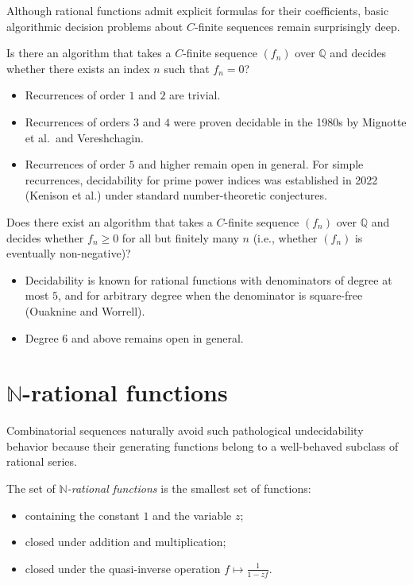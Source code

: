 Although rational functions admit explicit formulas for their coefficients, basic algorithmic decision problems about \(C\)-finite sequences remain surprisingly deep.

\begin{remark}
    Is there an algorithm that takes a \(C\)-finite sequence \((f_n)\) over \(\mathbb{Q}\) and decides whether there exists an index \(n\) such that \(f_n = 0\)?
    \begin{itemize}
        \item Recurrences of order \(1\) and \(2\) are trivial.
        \item Recurrences of orders \(3\) and \(4\) were proven decidable in the 1980s by Mignotte et al.\ and Vereshchagin.
        \item Recurrences of order \(5\) and higher remain open in general.
        For simple recurrences, decidability for prime power indices was established in 2022 (Kenison et al.) under standard number-theoretic conjectures.
    \end{itemize}
\end{remark}

\begin{remark}
    Does there exist an algorithm that takes a \(C\)-finite sequence \((f_n)\) over \(\mathbb{Q}\) and decides whether \(f_n \ge 0\) for all but finitely many \(n\) (i.e., whether \((f_n)\) is eventually non-negative)?
    \begin{itemize}
        \item Decidability is known for rational functions with denominators of degree at most \(5\), and for arbitrary degree when the denominator is square-free (Ouaknine and Worrell).
        \item Degree \(6\) and above remains open in general.
    \end{itemize}
\end{remark}


\section*{\texorpdfstring{$\mathbb{N}$}{N}-rational functions}

Combinatorial sequences naturally avoid such pathological undecidability behavior because their generating functions belong to a well-behaved subclass of rational series.

\begin{definition}
    \label{def:n-rational}
    The set of \emph{\(\mathbb{N}\)-rational functions} is the smallest set of functions:
    \begin{itemize}
        \item containing the constant \(1\) and the variable \(z\);
        \item closed under addition and multiplication;
        \item closed under the quasi-inverse operation \(f \mapsto \frac{1}{1 - zf}\).
    \end{itemize}
\end{definition}

